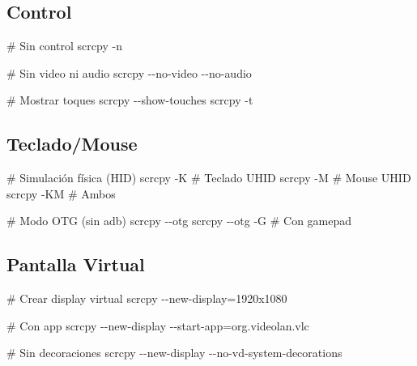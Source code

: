 \documentclass[
  doc,
  floatsintext,
  longtable,
  a4paper,
  nolmodern,
  notxfonts,
  notimes,
  12pt,
  colorlinks=true,linkcolor=blue,citecolor=blue,urlcolor=blue]{apa7}
\newenvironment{Shaded}{\begin{snugshade}}{\end{snugshade}}
\newcommand{\AttributeTok}[1]{\textcolor[rgb]{0.40,0.45,0.13}{#1}}
\newcommand{\CommentTok}[1]{\textcolor[rgb]{0.37,0.37,0.37}{#1}}
\newcommand{\ExtensionTok}[1]{\textcolor[rgb]{0.00,0.23,0.31}{#1}}
\newcommand{\NormalTok}[1]{\textcolor[rgb]{0.00,0.23,0.31}{#1}}
\newcommand{\OperatorTok}[1]{\textcolor[rgb]{0.37,0.37,0.37}{#1}}
\begin{document}
\subsection{Control}\label{control}

\begin{Shaded}
\begin{Highlighting}[]
\CommentTok{\# Sin control}
\ExtensionTok{scrcpy} \AttributeTok{{-}n}

\CommentTok{\# Sin video ni audio}
\ExtensionTok{scrcpy} \AttributeTok{{-}{-}no{-}video} \AttributeTok{{-}{-}no{-}audio}

\CommentTok{\# Mostrar toques}
\ExtensionTok{scrcpy} \AttributeTok{{-}{-}show{-}touches}
\ExtensionTok{scrcpy} \AttributeTok{{-}t}
\end{Highlighting}
\end{Shaded}

\subsection{Teclado/Mouse}\label{tecladomouse}

\begin{Shaded}
\begin{Highlighting}[]
\CommentTok{\# Simulación física (HID)}
\ExtensionTok{scrcpy} \AttributeTok{{-}K}                       \CommentTok{\# Teclado UHID}
\ExtensionTok{scrcpy} \AttributeTok{{-}M}                       \CommentTok{\# Mouse UHID}
\ExtensionTok{scrcpy} \AttributeTok{{-}KM}                      \CommentTok{\# Ambos}

\CommentTok{\# Modo OTG (sin adb)}
\ExtensionTok{scrcpy} \AttributeTok{{-}{-}otg}
\ExtensionTok{scrcpy} \AttributeTok{{-}{-}otg} \AttributeTok{{-}G}                 \CommentTok{\# Con gamepad}
\end{Highlighting}
\end{Shaded}

\subsection{Pantalla Virtual}\label{pantalla-virtual-1}

\begin{Shaded}
\begin{Highlighting}[]
\CommentTok{\# Crear display virtual}
\ExtensionTok{scrcpy} \AttributeTok{{-}{-}new{-}display}\OperatorTok{=}\NormalTok{1920x1080}

\CommentTok{\# Con app}
\ExtensionTok{scrcpy} \AttributeTok{{-}{-}new{-}display} \AttributeTok{{-}{-}start{-}app}\OperatorTok{=}\NormalTok{org.videolan.vlc}

\CommentTok{\# Sin decoraciones}
\ExtensionTok{scrcpy} \AttributeTok{{-}{-}new{-}display} \AttributeTok{{-}{-}no{-}vd{-}system{-}decorations}
\end{Highlighting}
\end{Shaded}
\end{document}
